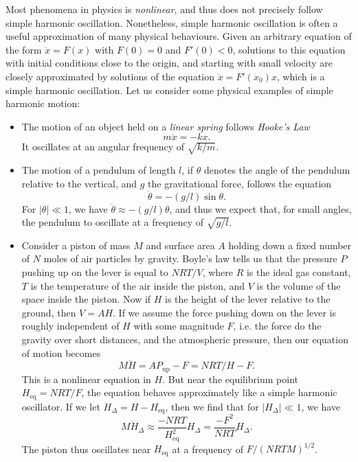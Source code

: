 Most phenomena in physics is \emph{nonlinear}, and thus does not precisely follow simple harmonic oscillation. Nonetheless, simple harmonic oscillation is often a useful approximation of many physical behaviours. Given an arbitrary equation of the form $\ddot{x} = F(x)$ with $F(0) = 0$ and $F'(0) < 0$, solutions to this equation with initial conditions close to the origin, and starting with small velocity are closely approximated by solutions of the equation $\ddot{x} = F'(x_0) x$, which is a simple harmonic oscillation. Let us consider some physical examples of simple harmonic motion:
%
\begin{itemize}
    \item The motion of an object held on a \emph{linear spring} follows \emph{Hooke's Law}
    \[ m \ddot{x} = -k x. \]
    It oscillates at an angular frequency of $\sqrt{k/m}$.

    \item The motion of a pendulum of length $l$, if $\theta$ denotes the angle of the pendulum relative to the vertical, and $g$ the gravitational force, follows the equation
    \[ \ddot{\theta} = - (g/l) \sin \theta. \]
    For $|\theta| \ll 1$, we have $\ddot{\theta} \approx - (g/l) \theta$, and thus we expect that, for small angles, the pendulum to oscillate at a frequency of $\sqrt{g/l}$.

    \item Consider a piston of mass $M$ and surface area $A$ holding down a fixed number of $N$ moles of air particles by gravity. Boyle's law tells us that the pressure $P$ pushing up on the lever is equal to $NRT/V$, where $R$ is the ideal gas constant, $T$ is the temperature of the air inside the piston, and $V$ is the volume of the space inside the piston. Now if $H$ is the height of the lever relative to the ground, then $V = AH$. If we assume the force pushing down on the lever is roughly independent of $H$ with some magnitude $F$, i.e. the force do the gravity over short distances, and the atmospheric pressure, then our equation of motion becomes
    \[ M \ddot{H} = A P_{\text{up}} - F = NRT/H - F.  \]
    This is a nonlinear equation in $H$. But near the equilibrium point $H_{\text{eq}} = NRT / F$, the equation behaves approximately like a simple harmonic oscillator. If we let $H_\Delta = H - H_{\text{eq}}$, then we find that for $|H_\Delta| \ll 1$, we have
    \[ M \ddot{H}_\Delta \approx \frac{-NRT}{H_{\text{eq}}^2} H_\Delta = \frac{-F^2}{NRT} H_\Delta. \]
    The piston thus oscillates near $H_{\text{eq}}$ at a frequency of $F / (NRTM)^{1/2}$.
\end{itemize}

